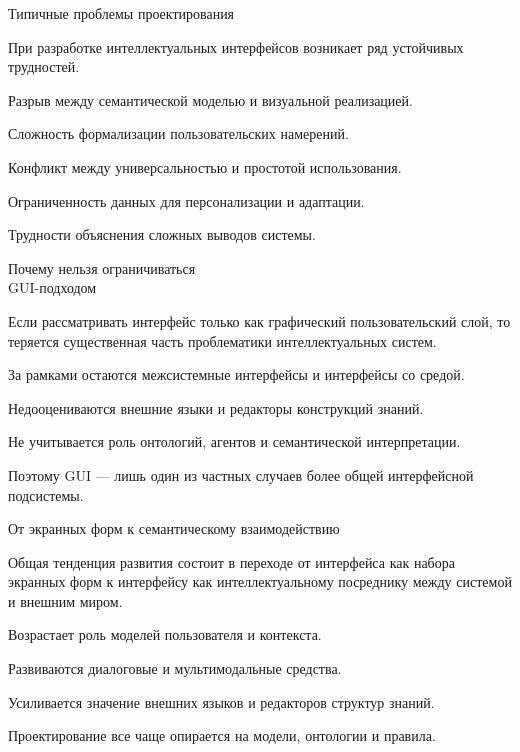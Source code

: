 \begin{frame}{Типичные проблемы проектирования}
	\topline
	\justifying

	При разработке интеллектуальных интерфейсов возникает ряд устойчивых трудностей.
	
	\begin{textitemize}
		\item Разрыв между семантической моделью и визуальной реализацией.
		\item Сложность формализации пользовательских намерений.
		\item Конфликт между универсальностью и простотой использования.
		\item Ограниченность данных для персонализации и адаптации.
		\item Трудности объяснения сложных выводов системы.
	\end{textitemize}
\end{frame}

\begin{frame}{Почему нельзя ограничиваться\\ GUI-подходом}
	\topline
	\justifying

	Если рассматривать интерфейс только как графический пользовательский слой, то теряется существенная часть проблематики интеллектуальных систем.
	
	\begin{textitemize}
		\item За рамками остаются межсистемные интерфейсы и интерфейсы со средой.
		\item Недооцениваются внешние языки и редакторы конструкций знаний.
		\item Не учитывается роль онтологий, агентов и семантической интерпретации.
		\item Поэтому GUI --- лишь один из частных случаев более общей интерфейсной подсистемы.
	\end{textitemize}
\end{frame}

\begin{frame}{От экранных форм к семантическому взаимодействию}
	\topline
	\justifying

	Общая тенденция развития состоит в переходе от интерфейса как набора экранных форм к интерфейсу как интеллектуальному посреднику между системой и внешним миром.
	
	\begin{textitemize}
		\item Возрастает роль моделей пользователя и контекста.
		\item Развиваются диалоговые и мультимодальные средства.
		\item Усиливается значение внешних языков и редакторов структур знаний.
		\item Проектирование все чаще опирается на модели, онтологии и правила.
	\end{textitemize}
\end{frame}

